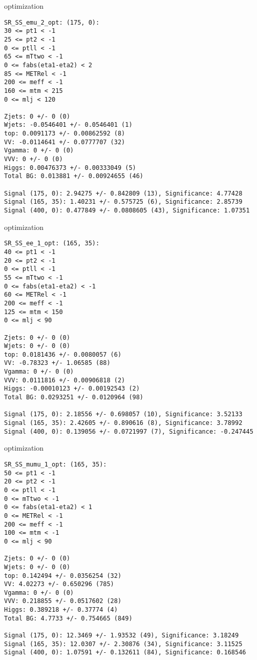 \begin{frame}[fragile]{optimization}
\tiny
\begin{verbatim}
SR_SS_emu_2_opt: (175, 0):
30 <= pt1 < -1
25 <= pt2 < -1
0 <= ptll < -1
65 <= mTtwo < -1
0 <= fabs(eta1-eta2) < 2
85 <= METRel < -1
200 <= meff < -1
160 <= mtm < 215
0 <= mlj < 120

Zjets: 0 +/- 0 (0)
Wjets: -0.0546401 +/- 0.0546401 (1)
top: 0.0091173 +/- 0.00862592 (8)
VV: -0.0114641 +/- 0.0777707 (32)
Vgamma: 0 +/- 0 (0)
VVV: 0 +/- 0 (0)
Higgs: 0.00476373 +/- 0.00333049 (5)
Total BG: 0.013881 +/- 0.00924655 (46)

Signal (175, 0): 2.94275 +/- 0.842809 (13), Significance: 4.77428
Signal (165, 35): 1.40231 +/- 0.575725 (6), Significance: 2.85739
Signal (400, 0): 0.477849 +/- 0.0808605 (43), Significance: 1.07351

\end{verbatim}
\end{frame}

\begin{frame}[fragile]{optimization}
\tiny
\begin{verbatim}
SR_SS_ee_1_opt: (165, 35):
40 <= pt1 < -1
20 <= pt2 < -1
0 <= ptll < -1
55 <= mTtwo < -1
0 <= fabs(eta1-eta2) < -1
60 <= METRel < -1
200 <= meff < -1
125 <= mtm < 150
0 <= mlj < 90

Zjets: 0 +/- 0 (0)
Wjets: 0 +/- 0 (0)
top: 0.0181436 +/- 0.0080057 (6)
VV: -0.78323 +/- 1.06585 (88)
Vgamma: 0 +/- 0 (0)
VVV: 0.0111816 +/- 0.00906818 (2)
Higgs: -0.00010123 +/- 0.00192543 (2)
Total BG: 0.0293251 +/- 0.0120964 (98)

Signal (175, 0): 2.18556 +/- 0.698057 (10), Significance: 3.52133
Signal (165, 35): 2.42605 +/- 0.890616 (8), Significance: 3.78992
Signal (400, 0): 0.139056 +/- 0.0721997 (7), Significance: -0.247445
\end{verbatim}
\end{frame}

\begin{frame}[fragile]{optimization}
\tiny
\begin{verbatim}
SR_SS_mumu_1_opt: (165, 35):
50 <= pt1 < -1
20 <= pt2 < -1
0 <= ptll < -1
0 <= mTtwo < -1
0 <= fabs(eta1-eta2) < 1
0 <= METRel < -1
200 <= meff < -1
100 <= mtm < -1
0 <= mlj < 90

Zjets: 0 +/- 0 (0)
Wjets: 0 +/- 0 (0)
top: 0.142494 +/- 0.0356254 (32)
VV: 4.02273 +/- 0.650296 (785)
Vgamma: 0 +/- 0 (0)
VVV: 0.218855 +/- 0.0517602 (28)
Higgs: 0.389218 +/- 0.37774 (4)
Total BG: 4.7733 +/- 0.754665 (849)

Signal (175, 0): 12.3469 +/- 1.93532 (49), Significance: 3.18249
Signal (165, 35): 12.0307 +/- 2.30876 (34), Significance: 3.11525
Signal (400, 0): 1.07591 +/- 0.132611 (84), Significance: 0.168546
\end{verbatim}
\end{frame}

